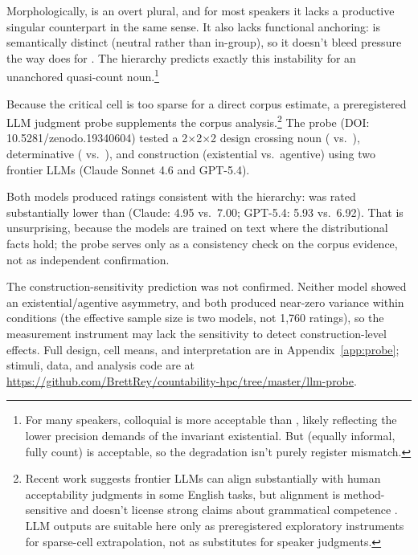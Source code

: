 \documentclass[12pt,a4paper]{article}
\begin{document}
Morphologically,  is an overt plural, and for most speakers it lacks a productive singular counterpart in the same sense. It also lacks functional anchoring:  is semantically distinct (neutral rather than in-group), so it doesn't bleed pressure the way  does for . The hierarchy predicts exactly this instability for an unanchored quasi-count noun.\footnote{For many speakers, colloquial  is more acceptable than , likely reflecting the lower precision demands of the invariant existential. But  (equally informal, fully count) is acceptable, so the  degradation isn't purely register mismatch.}

Because the critical  cell is too sparse for a direct corpus estimate, a preregistered LLM judgment probe supplements the corpus analysis.\footnote{Recent work suggests frontier LLMs can align substantially with human acceptability judgments in some English tasks, but alignment is method-sensitive and doesn't license strong claims about grammatical competence \citep{qiu2024,qiu2025,hu2024,hu-levy2023,sinha2023,dentella2023,leivada2024reply,juzek2024}. LLM outputs are suitable here only as preregistered exploratory instruments for sparse-cell extrapolation, not as substitutes for speaker judgments.} The probe (DOI: 10.5281/zenodo.19340604) tested a 2$\times$2$\times$2 design crossing noun ( vs.\ ), determinative ( vs.\ ), and construction (existential vs.\ agentive) using two frontier LLMs (Claude Sonnet 4.6 and GPT-5.4).

Both models produced ratings consistent with the hierarchy:  was rated substantially lower than  (Claude: 4.95 vs.\ 7.00; GPT-5.4: 5.93 vs.\ 6.92). That is unsurprising, because the models are trained on text where the distributional facts hold; the probe serves only as a consistency check on the corpus evidence, not as independent confirmation.

The construction-sensitivity prediction was not confirmed. Neither model showed an existential/agentive asymmetry, and both produced near-zero variance within conditions (the effective sample size is two models, not 1{,}760 ratings), so the measurement instrument may lack the sensitivity to detect construction-level effects. Full design, cell means, and interpretation are in Appendix~\ref{app:probe}; stimuli, data, and analysis code are at \url{https://github.com/BrettRey/countability-hpc/tree/master/llm-probe}.
\end{document}
